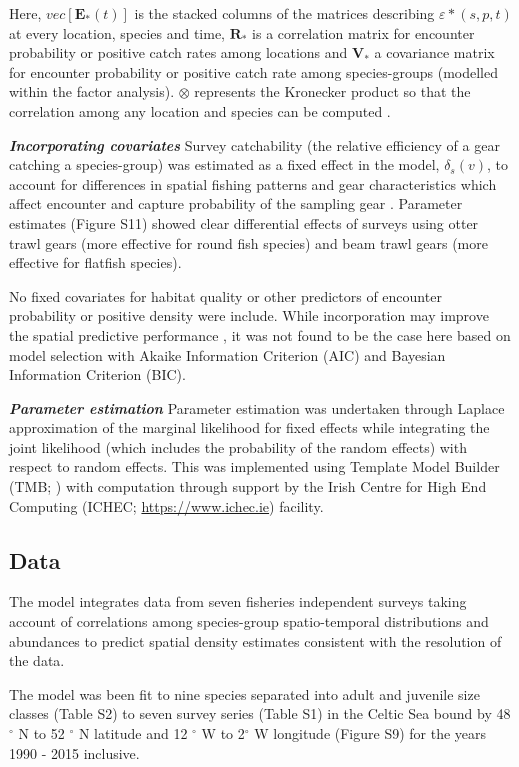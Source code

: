 \documentclass{nature}
\begin{document}
\begin{linenumbers}
Here, $vec[\mathbf{E}_{*}(t)]$ is the stacked columns of the matrices
describing $\varepsilon{*}(s,p,t)$ at every location, species and time,
$\mathbf{R}_{*}$ is a correlation matrix for encounter probability or positive
catch rates among locations and $\mathbf{V}_{*}$ a covariance matrix for
encounter probability or positive catch rate among species-groups (modelled
within the factor analysis). $\otimes$ represents the Kronecker product so that
the correlation among any location and species can be computed
\cite{Thorson2017}.
		
\textbf{\textit{Incorporating covariates}} Survey catchability (the relative
efficiency of a gear catching a species-group) was estimated as a fixed effect
in the model, $\delta_{s}(v)$, to account for differences in spatial fishing
patterns and gear characteristics which affect encounter and capture
probability of the sampling gear \cite{Thorson2014}. Parameter estimates
(Figure S11) showed clear differential effects of surveys using otter trawl
gears (more effective for round fish species) and beam trawl gears (more
effective for flatfish species).

No fixed covariates for habitat quality or other predictors of encounter
probability or positive density were include. While incorporation may improve
the spatial predictive performance \cite{Thorson2017}, it was not found to be
the case here based on model selection with Akaike Information Criterion (AIC)
and Bayesian Information Criterion (BIC).

\textbf{\textit{Parameter estimation}} Parameter estimation was undertaken
through Laplace approximation of the marginal likelihood for fixed effects
while integrating the joint likelihood (which includes the probability of the
random effects) with respect to random effects. This was implemented using
Template Model Builder (TMB; \cite{Kristensen2015}) with computation through
support by the Irish Centre for High End Computing (ICHEC;
\url{https://www.ichec.ie}) facility.  

\subsection{Data}

The model integrates data from seven fisheries independent surveys taking
account of correlations among species-group spatio-temporal distributions and
abundances to predict spatial density estimates consistent with the resolution
of the data. 

The model was been fit to nine species separated into adult and juvenile size
classes (Table S2) to seven survey series (Table S1) in the Celtic Sea bound by
48$^{\circ}$ N to 52 $^{\circ}$ N latitude and 12 $^{\circ}$ W to 2$^{\circ}$ W
longitude (Figure S9) for the years 1990 - 2015 inclusive. 


\end{linenumbers}
\end{document}

